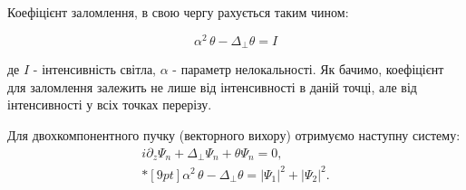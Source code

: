 Коефіцієнт заломлення, в свою чергу рахується таким чином:

\begin{equation}
\alpha^2\,\theta-\Delta_\perp\theta=I
\end{equation}

де $I$ - інтенсивність світла, $\alpha$ - параметр нелокальності. Як бачимо, коефіцієнт для заломлення залежить не лише від інтенсивності в даній точці, але від інтенсивності у всіх точках перерізу.

Для двохкомпонентного пучку (векторного вихору) отримуємо наступну систему:
\begin{equation}
   \begin{array}{l} {\displaystyle
       i\partial_z \Psi_n+\Delta_\perp\Psi_n +\theta\Psi_n=0,
       } \\*[9pt] {\displaystyle
\alpha^2\,\theta-\Delta_\perp\theta=|\Psi_1|^2+|\Psi_2|^2.
   }\end{array}
   \label{eq:NLS}
\end{equation}